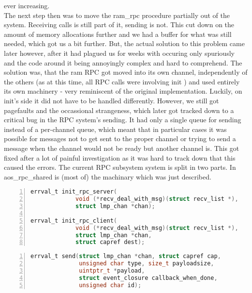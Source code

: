 ever increasing.\\
The next step then was to move the ram\_rpc procedure partially out of the system. 
Receiving calls is still part of it, sending is not. This cut down on the amount of memory allocations 
further and we had a buffer for what was still needed, which got us a bit 
further. But, the actual solution to this problem came later however, after it 
had plagued us for weeks with occuring only spuriously and the code around it 
being annoyingly complex and hard to comprehend.
The solution was, that the ram RPC got moved into its own channel, 
independently of the others (as at this time, all RPC calls were involving init
) and used entirely its own machinery - very reminiscent of the original 
implementation. Luckily, on init's side it did not have to be handled 
differently.
However, we still got pagefaults and the occassional strangeness, which 
later got tracked down to a critical bug in the RPC system's sending. It had 
only a single queue for sending instead of a per-channel queue, which meant 
that in particular cases it was possible for messages not to get sent to the 
proper channel or trying to send a message when the channel would not be ready but 
another channel is. This got fixed after a lot of painful investigation as it 
was hard to track down that this caused the errors.
The current RPC subsystem system is split in two parts. In 
aos\_rpc\_shared is (most of) the machinary which was just described.
\medskip

\begin{lstlisting}[caption={RPC system inits}, 
label=lst:rpc_calls_1, numbers=left, stepnumber=1, float, floatplacement=tl, 
frame=tb, language=c]
errval_t init_rpc_server(
             void (*recv_deal_with_msg)(struct recv_list *),
             struct lmp_chan *chan);

errval_t init_rpc_client(
             void (*recv_deal_with_msg)(struct recv_list *),
             struct lmp_chan *chan, 
             struct capref dest);
\end{lstlisting}
\begin{lstlisting}[caption={RPC send}, 
label=lst:rpc_calls_2, numbers=left, stepnumber=1, float, floatplacement=tl, 
frame=tb, language=c]
errval_t send(struct lmp_chan *chan, struct capref cap, 
              unsigned char type, size_t payloadsize, 
              uintptr_t *payload, 
              struct event_closure callback_when_done, 
              unsigned char id);
\end{lstlisting}


